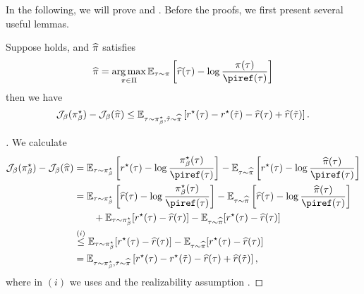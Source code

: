 \documentclass{article}
\begin{document}
In the following, we will prove  and . Before the proofs, we first present several useful lemmas.
\begin{lemma}\label{lem: dpo-proof-1}
    Suppose  holds, and $\widehat{\pi}$ satisfies
    \begin{equation}\label{eq: condition-pihat}
        \pihat = \argmax_{\pi\in \Pi} \EE_{\tau\sim \pi}\left[\hr(\tau) - \log\frac{\pi(\tau)}{\piref(\tau)}\right]
    \end{equation}
    then we have 
    $$\mathcal{J}_\beta(\pi_\beta^\star) - \mathcal{J}_\beta(\widehat{\pi}) \le \mathbb{E}_{\tau\sim \pi_\beta^\star, \tilde{\tau}\sim \widehat{\pi}}\left[r^\star(\tau) - r^\star(\tilde{\tau}) - \widehat{r}(\tau) + \widehat{r}(\tilde{\tau})\right].$$
\end{lemma}
\begin{proof}[]
    We calculate 
    \begin{align*}
        \Jbeta(\pi_\beta^\star) - \Jbeta(\pihat) & = \EE_{\tau\sim \pi_\beta^\star}\left[r^\star(\tau) - \log\frac{\pi_\beta^\star(\tau)}{\piref(\tau)}\right] - \EE_{\tau\sim \pihat}\left[r^\star(\tau) - \log\frac{\hpi(\tau)}{\piref(\tau)}\right]\\
        & = \EE_{\tau\sim \pi_\beta^\star}\left[\hr(\tau) - \log\frac{\pi_\beta^\star(\tau)}{\piref(\tau)}\right] - \EE_{\tau\sim \pihat}\left[\hr(\tau) - \log\frac{\hpi(\tau)}{\piref(\tau)}\right]\\
        & \qquad + \EE_{\tau\sim \pi_\beta^\star}[r^\star(\tau) - \hr(\tau)] - \EE_{\tau\sim \pihat}[r^\star(\tau) - \hr(\tau)]\\
        & \stackrel{(i)}{\le} \EE_{\tau\sim \pi_\beta^\star}[r^\star(\tau) - \hr(\tau)] - \EE_{\tau\sim \pihat}[r^\star(\tau) - \hr(\tau)]\\
        & = \EE_{\tau\sim \pi_\beta^\star, \ttau\sim \pihat}\left[r^\star(\tau) - r^\star(\ttau) - \hr(\tau) + \hr(\ttau)\right],
    \end{align*}
    where in $(i)$ we uses  and the realizability assumption .
\end{proof}

\end{document}
